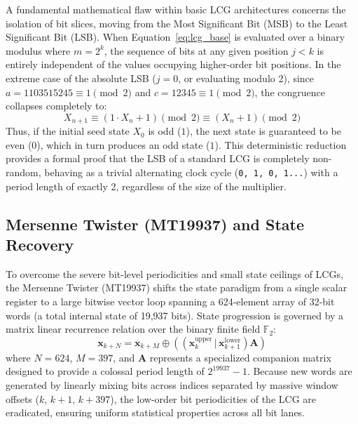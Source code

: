 \documentclass[twocolumn,10pt]{article}
\begin{document}
A fundamental mathematical flaw within basic LCG architectures concerns the isolation of bit slices, moving from the Most Significant Bit (MSB) to the Least Significant Bit (LSB). When Equation~\ref{eq:lcg_base} is evaluated over a binary modulus where $m = 2^k$, the sequence of bits at any given position $j < k$ is entirely independent of the values occupying higher-order bit positions. In the extreme case of the absolute LSB ($j=0$, or evaluating modulo 2), since $a = 1103515245 \equiv 1 \pmod 2$ and $c = 12345 \equiv 1 \pmod 2$, the congruence collapses completely to:
\begin{equation}
X_{n+1} \equiv (1 \cdot X_n + 1) \pmod 2 \equiv (X_n + 1) \pmod 2
\end{equation}
Thus, if the initial seed state $X_0$ is odd ($1$), the next state is guaranteed to be even ($0$), which in turn produces an odd state ($1$). This deterministic reduction provides a formal proof that the LSB of a standard LCG is completely non-random, behaving as a trivial alternating clock cycle (\texttt{0, 1, 0, 1...}) with a period length of exactly 2, regardless of the size of the multiplier.

\subsection{Mersenne Twister (MT19937) and State Recovery}
To overcome the severe bit-level periodicities and small state ceilings of LCGs, the Mersenne Twister (MT19937) shifts the state paradigm from a single scalar register to a large bitwise vector loop spanning a 624-element array of 32-bit words (a total internal state of 19,937 bits). State progression is governed by a matrix linear recurrence relation over the binary finite field $\mathbb{F}_2$:
\begin{equation}
\mathbf{x}_{k+N} = \mathbf{x}_{k+M} \oplus \left( (\mathbf{x}_k^{\text{upper}} \,|\, \mathbf{x}_{k+1}^{\text{lower}}) \mathbf{A} \right)
\end{equation}
where $N=624$, $M=397$, and $\mathbf{A}$ represents a specialized companion matrix designed to provide a colossal period length of $2^{19937}-1$. Because new words are generated by linearly mixing bits across indices separated by massive window offsets ($k$, $k+1$, $k+397$), the low-order bit periodicities of the LCG are eradicated, ensuring uniform statistical properties across all bit lanes.
\end{document}
